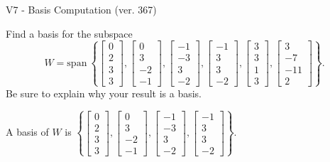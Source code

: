 \begin{exercise}
  \begin{exerciseTitle}V7 - Basis Computation (ver. 367)\end{exerciseTitle}
  \begin{exerciseStatement}
    Find a basis for the subspace 
\[W=\mathrm{span}\ \left\{\left[\begin{array}{r}
0 \\
2 \\
3 \\
3
\end{array}\right] , \left[\begin{array}{r}
0 \\
3 \\
-2 \\
-1
\end{array}\right] , \left[\begin{array}{r}
-1 \\
-3 \\
3 \\
-2
\end{array}\right] , \left[\begin{array}{r}
-1 \\
3 \\
3 \\
-2
\end{array}\right] , \left[\begin{array}{r}
3 \\
3 \\
1 \\
3
\end{array}\right] , \left[\begin{array}{r}
3 \\
-7 \\
-11 \\
2
\end{array}\right]\right\}.\]
 Be sure to explain why your result is a basis.


  \end{exerciseStatement}
  \begin{exerciseAnswer}
   A basis of \(W\) is  \(\left\{\left[\begin{array}{r}
0 \\
2 \\
3 \\
3
\end{array}\right] , \left[\begin{array}{r}
0 \\
3 \\
-2 \\
-1
\end{array}\right] , \left[\begin{array}{r}
-1 \\
-3 \\
3 \\
-2
\end{array}\right] , \left[\begin{array}{r}
-1 \\
3 \\
3 \\
-2
\end{array}\right]\right\}\).
  


  \end{exerciseAnswer}
\end{exercise}